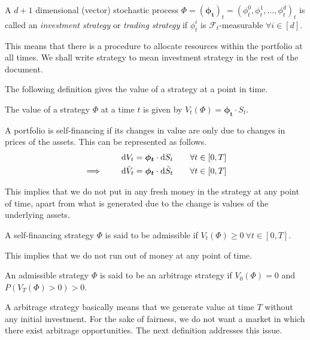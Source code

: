 \begin{dfn}
	A $ d + 1 $ dimensional (vector) stochastic process $ \Phi = (\bm{\phi_t})_t = (\phi_t^0, \phi_t^1, \dots, \phi_t^d)_t $ is called an \emph{investment strategy} or \emph{trading strategy} if $ \phi_t^i $ is $ \mathcal{F}_t $-measurable $ \forall i \in [d] $.
\end{dfn}
This means that there is a procedure to allocate resources within the portfolio at all times. We shall write strategy to mean investment strategy in the rest of the document.

The following definition gives the value of a strategy at a point in time.
\begin{dfn}
	The value of a strategy $ \Phi $ at a time $ t $ is given by $ V_t( \Phi ) = \bm{\phi_t} \cdot S_t $.
\end{dfn}

\begin{dfn}
	A portfolio is self-financing if its changes in value are only due to changes in prices of the assets. This can be represented as follows.
	\begin{subequations}
		\begin{align}
			\dif V_t &= \bm{\phi_t} \cdot \dif S_t \qquad \forall t \in [0, T]  \\
			\implies  \qquad  \dif \tilde{V}_t &= \bm{\phi_t} \cdot \dif \tilde{S}_t \qquad \forall t \in [0, T]
		\end{align}
	\end{subequations}
\end{dfn}
This implies that we do not put in any fresh money in the strategy at any point of time, apart from what is generated due to the change is values of the underlying assets.

\begin{dfn}
	A self-financing strategy $ \Phi $ is said to be admissible if $ V_t( \Phi ) \ge 0 \  \forall t \in [0, T] $.
\end{dfn}
This implies that we do not run out of money at any point of time.

\begin{dfn}
	An admissible strategy $ \Phi $ is said to be an arbitrage strategy if $ V_0( \Phi ) = 0 $ and $ P( V_T( \Phi ) > 0 ) > 0 $.
\end{dfn}
A arbitrage strategy basically means that we generate value at time $ T $ without any initial investment. For the sake of fairness, we do not want a market in which there exist arbitrage opportunities. The next definition addresses this issue.

